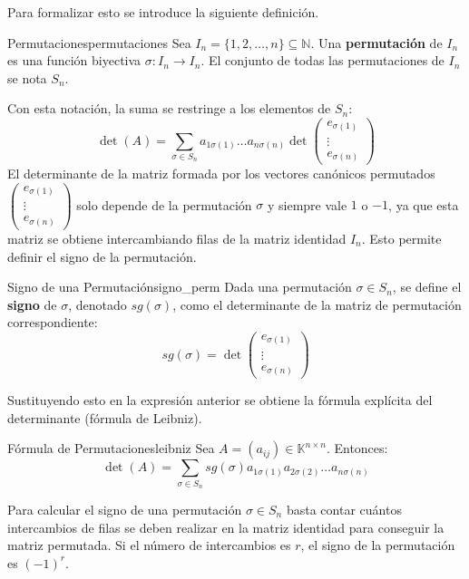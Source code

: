 \documentclass[11pt, a4paper]{article}
\begin{document}
Para formalizar esto se introduce la siguiente definición.

\begin{definicion}{Permutaciones}{permutaciones}
Sea $I_n = \{1, 2, \dots, n\} \subseteq \mathbb{N}$. Una \textbf{permutación} de $I_n$ es una función biyectiva $\sigma: I_n \to I_n$.
El conjunto de todas las permutaciones de $I_n$ se nota $S_n$.
\end{definicion}

Con esta notación, la suma se restringe a los elementos de $S_n$:
\[
\det(A) = \sum_{\sigma \in S_n} a_{1 \sigma(1)} \dots a_{n \sigma(n)} \det \begin{pmatrix} e_{\sigma(1)} \\ \vdots \\ e_{\sigma(n)} \end{pmatrix}
\]
El determinante de la matriz formada por los vectores canónicos permutados $\begin{pmatrix} e_{\sigma(1)} \\ \vdots \\ e_{\sigma(n)} \end{pmatrix}$ solo depende de la permutación $\sigma$ y siempre vale $1$ o $-1$, ya que esta matriz se obtiene intercambiando filas de la matriz identidad $I_n$.
Esto permite definir el signo de la permutación.

\begin{definicion}{Signo de una Permutación}{signo_perm}
Dada una permutación $\sigma \in S_n$, se define el \textbf{signo} de $\sigma$, denotado $sg(\sigma)$, como el determinante de la matriz de permutación correspondiente:
\[
sg(\sigma) = \det \begin{pmatrix} e_{\sigma(1)} \\ \vdots \\ e_{\sigma(n)} \end{pmatrix}
\]
\end{definicion}

Sustituyendo esto en la expresión anterior se obtiene la fórmula explícita del determinante (fórmula de Leibniz).

\begin{proposicion}{Fórmula de Permutaciones}{leibniz}
Sea $A = (a_{ij}) \in \mathbb{K}^{n \times n}$. Entonces:
\[
\det(A) = \sum_{\sigma \in S_n} sg(\sigma) a_{1 \sigma(1)} a_{2 \sigma(2)} \dots a_{n \sigma(n)}
\]
\end{proposicion}

\obs Para calcular el signo de una permutación $\sigma \in S_n$ basta contar cuántos intercambios de filas se deben realizar en la matriz identidad para conseguir la matriz permutada.
Si el número de intercambios es $r$, el signo de la permutación es $(-1)^r$.
\end{document}
